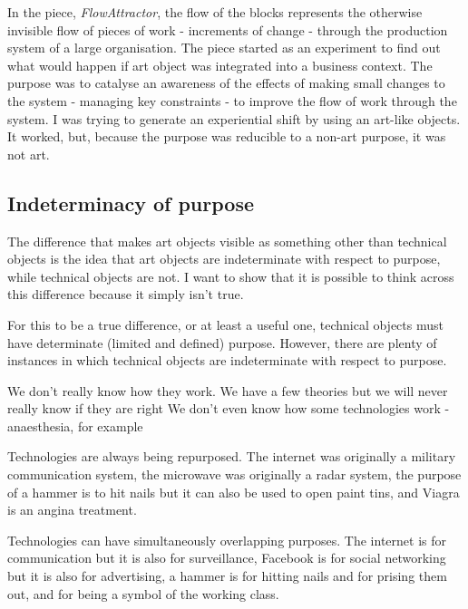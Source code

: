 \documentclass[letterpaper]{article}
\begin{document}
    In the piece, \emph{FlowAttractor}, the flow of the blocks represents the otherwise invisible flow of pieces of work - increments of change - through the production system of a large organisation. The piece started as an experiment to find out what would happen if art object was integrated into a business context. The purpose was to catalyse an awareness of the effects of making small changes to the system - managing key constraints - to improve the flow of work through the system. I was trying to generate an experiential shift by using an art-like objects. It worked, but, because the purpose was reducible to a non-art purpose, it was not art.


    \subsection{Indeterminacy of purpose}

    The difference that makes art objects visible as something other than technical objects is the idea that art objects are indeterminate with respect to purpose, while technical objects are not. I want to show that it is possible to think across this difference because it simply isn't true.

    For this to be a true difference, or at least a useful one, technical objects must have determinate (limited and defined) purpose. However, there are plenty of instances in which technical objects are indeterminate with respect to purpose.

    We don't really know how they work. We have a few theories but we will never really know if they are right
    We don't even know how some technologies work - anaesthesia, for example
    
    Technologies are always being repurposed. The internet was originally a military communication system, the microwave was originally a radar system, the purpose of a hammer is to hit nails but it can also be used to open paint tins, and Viagra is an angina treatment.

    Technologies can have simultaneously overlapping purposes. The internet is for communication but it is also for surveillance, Facebook is for social networking but it is also for advertising, a hammer is for hitting nails and for prising them out, and for being a symbol of the working class.
\end{document}
